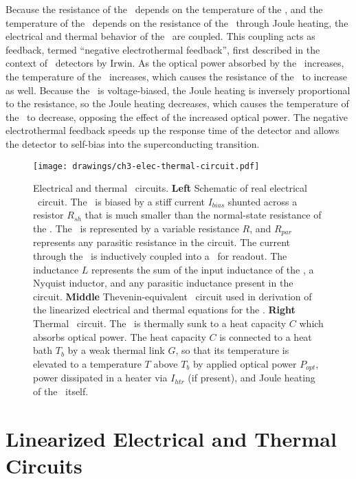 Because the resistance of the \TES\ depends on the temperature of the \TES, and the temperature of the \TES\ depends on the resistance of the \TES\ through Joule heating, the electrical and thermal behavior of the \TES\ are coupled.
This coupling acts as feedback, termed ``negative electrothermal feedback'', first described in the context of \TES\ detectors by Irwin\cite{irwin_application_1995}.
As the optical power absorbed by the \TES\ increases, the temperature of the \TES\ increases, which causes the resistance of the \TES\ to increase as well.
Because the \TES\ is voltage-biased, the Joule heating is inversely proportional to the resistance, so the Joule heating decreases, which causes the temperature of the \TES\ to decrease, opposing the effect of the increased optical power.
The negative electrothermal feedback speeds up the response time of the detector and allows the detector to self-bias into the superconducting transition.

\begin{figure*}
\centering
\texttt{[image: drawings/ch3-elec-thermal-circuit.pdf]}
\caption[Electrical and thermal \TES\ circuits]{
Electrical and thermal \TES\ circuits.
\textbf{Left} Schematic of real electrical \TES\ circuit.
The \TES\ is biased by a stiff current $I_{bias}$ shunted across a resistor $R_{sh}$ that is much smaller than the normal-state resistance of the \TES.
The \TES\ is represented by a variable resistance $R$, and $R_{par}$ represents any parasitic resistance in the circuit.
The current through the \TES\ is inductively coupled into a \SQUID\ for readout.
The inductance $L$ represents the sum of the input inductance of the \SQUID, a Nyquist inductor, and any parasitic inductance present in the circuit.
\textbf{Middle} Thevenin-equivalent \TES\ circuit used in derivation of the linearized electrical and thermal equations for the \TES.
\textbf{Right} Thermal \TES\ circuit.
The \TES\ is thermally sunk to a heat capacity $C$ which absorbs optical power.
The heat capacity $C$ is connected to a heat bath $T_b$ by a weak thermal link $G$, so that its temperature is elevated to a temperature $T$ above $T_b$ by applied optical power $P_{opt}$, power dissipated in a heater via $I_{htr}$ (if present), and Joule heating of the \TES\ itself.}
\label{fig:elec-thermal-circuit}
\end{figure*}

\section{Linearized Electrical and Thermal Circuits}\label{sec:lin-tes-eqn}

